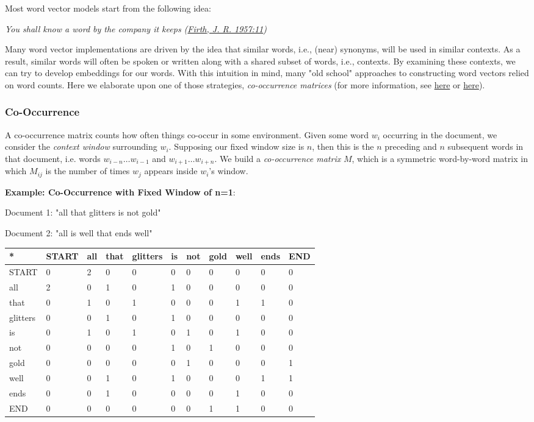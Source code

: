 \documentclass[11pt]{article}
\begin{document}
Most word vector models start from the following idea:

\emph{You shall know a word by the company it keeps
(\href{https://en.wikipedia.org/wiki/John_Rupert_Firth}{Firth, J. R.
1957:11})}

Many word vector implementations are driven by the idea that similar
words, i.e., (near) synonyms, will be used in similar contexts. As a
result, similar words will often be spoken or written along with a
shared subset of words, i.e., contexts. By examining these contexts, we
can try to develop embeddings for our words. With this intuition in
mind, many "old school" approaches to constructing word vectors relied
on word counts. Here we elaborate upon one of those strategies,
\emph{co-occurrence matrices} (for more information, see
\href{http://web.stanford.edu/class/cs124/lec/vectorsemantics.video.pdf}{here}
or
\href{https://medium.com/data-science-group-iitr/word-embedding-2d05d270b285}{here}).

    \subsubsection{Co-Occurrence}\label{co-occurrence}

A co-occurrence matrix counts how often things co-occur in some
environment. Given some word \(w_i\) occurring in the document, we
consider the \emph{context window} surrounding \(w_i\). Supposing our
fixed window size is \(n\), then this is the \(n\) preceding and \(n\)
subsequent words in that document, i.e. words \(w_{i-n} \dots w_{i-1}\)
and \(w_{i+1} \dots w_{i+n}\). We build a \emph{co-occurrence matrix}
\(M\), which is a symmetric word-by-word matrix in which \(M_{ij}\) is
the number of times \(w_j\) appears inside \(w_i\)'s window.

\textbf{Example: Co-Occurrence with Fixed Window of n=1}:

Document 1: "all that glitters is not gold"

Document 2: "all is well that ends well"

\begin{longtable}[]{@{}lllllllllll@{}}
\toprule
* & START & all & that & glitters & is & not & gold & well & ends &
END\tabularnewline
\midrule
\endhead
START & 0 & 2 & 0 & 0 & 0 & 0 & 0 & 0 & 0 & 0\tabularnewline
all & 2 & 0 & 1 & 0 & 1 & 0 & 0 & 0 & 0 & 0\tabularnewline
that & 0 & 1 & 0 & 1 & 0 & 0 & 0 & 1 & 1 & 0\tabularnewline
glitters & 0 & 0 & 1 & 0 & 1 & 0 & 0 & 0 & 0 & 0\tabularnewline
is & 0 & 1 & 0 & 1 & 0 & 1 & 0 & 1 & 0 & 0\tabularnewline
not & 0 & 0 & 0 & 0 & 1 & 0 & 1 & 0 & 0 & 0\tabularnewline
gold & 0 & 0 & 0 & 0 & 0 & 1 & 0 & 0 & 0 & 1\tabularnewline
well & 0 & 0 & 1 & 0 & 1 & 0 & 0 & 0 & 1 & 1\tabularnewline
ends & 0 & 0 & 1 & 0 & 0 & 0 & 0 & 1 & 0 & 0\tabularnewline
END & 0 & 0 & 0 & 0 & 0 & 0 & 1 & 1 & 0 & 0\tabularnewline
\bottomrule
\end{longtable}
\end{document}
